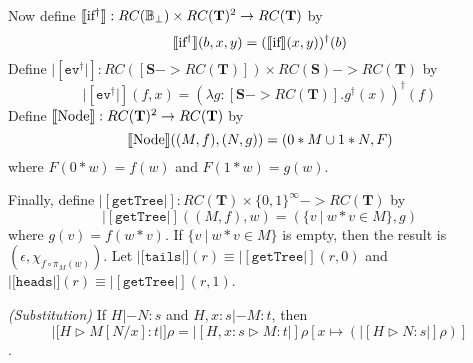 Now define $|[\If\!\!^\dagger|] : RC(\Bool_\bot) \times RC(\mathbf{T})^2 -> RC(\mathbf{T})$ by 
\begin{displaymath}
|[\textrm{if }\!\!^\dagger|](b,x,y) = (|[\textrm{if }\!\!|](x,y))^\dagger(b)
\end{displaymath}
Define $|[\texttt{ev}^\dagger|] : RC([\mathbf{S} -> RC(\mathbf{T})]) \times RC(\mathbf{S}) -> RC(\mathbf{T})$ by 
\begin{displaymath}
|[\texttt{ev}^\dagger|](f,x) = 
(\lambda g:[\mathbf{S}->RC(\mathbf{T})].g^\dagger(x))^\dagger (f)
\end{displaymath}
Define $|[\textrm{Node }\!\!|] : RC(\mathbf{T})^2 -> RC(\mathbf{T})$ by 
\begin{displaymath}
|[\textrm{Node }\!\!|]((M,f), (N,g)) = (0*M \cup 1*N, F)
\end{displaymath}
where $F(0*w) = f(w)$ and $F(1*w) = g(w)$.

\noindent Finally, define $|[\texttt{getTree}|] : 
RC(\mathbf{T}) \times \{0,1\}^\infty -> RC(\mathbf{T})$ by
\begin{displaymath}
|[\texttt{getTree}|]((M,f), w) = (\{v\ |\ w*v\in M\}, g)
\end{displaymath}
where $g(v) = f(w*v)$.  If $\{v\ |\ w*v\in M\}$ is empty, then the result is $(\epsilon, \chi_{f\circ\pi_M(w)})$.  Let $|[\texttt{tails}|](r)\equiv |[\texttt{getTree}|](r, 0)$ and $|[\texttt{heads}|](r)\equiv |[\texttt{getTree}|](r, 1)$.


\begin{lemma}
\emph{(Substitution)} If $H|-N:s$ and $H,x:s|-M:t$, then
\[ |[H\triangleright M[N/x]:t|]\rho = |[H,x:s\triangleright M:t|]\rho[x\mapsto (|[H\triangleright N:s|]\rho)] \].
\end{lemma}


